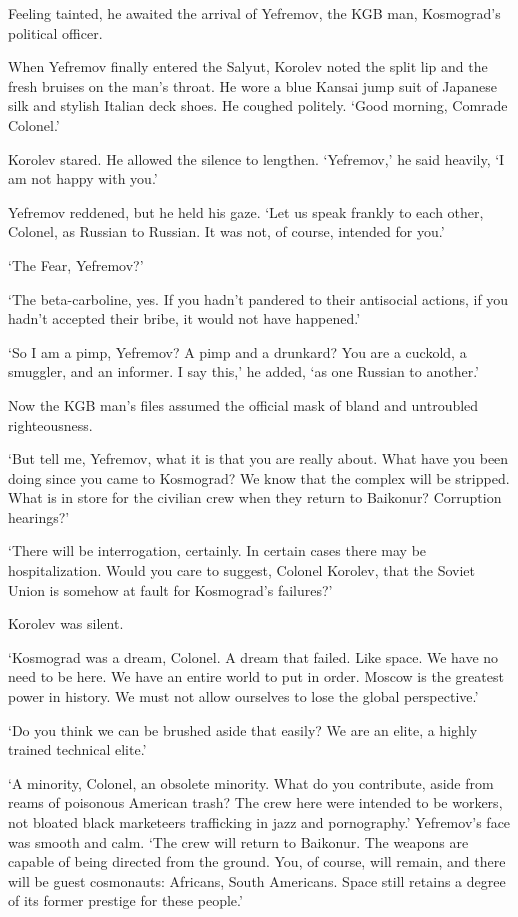 Feeling tainted, he awaited the arrival of Yefremov, the KGB man, Kosmograd’s political officer.

When Yefremov finally entered the Salyut, Korolev noted the split lip and the fresh bruises on the man’s throat. He wore a blue Kansai jump suit of Japanese silk and stylish Italian deck shoes. He coughed politely. ‘Good morning, Comrade Colonel.’

Korolev stared. He allowed the silence to lengthen. ‘Yefremov,’ he said heavily, ‘I am not happy with you.’

Yefremov reddened, but he held his gaze. ‘Let us speak frankly to each other, Colonel, as Russian to Russian. It was not, of course, intended for you.’

‘The Fear, Yefremov?’

‘The beta-carboline, yes. If you hadn’t pandered to their antisocial actions, if you hadn’t accepted their bribe, it would not have happened.’

‘So I am a pimp, Yefremov? A pimp and a drunkard? You are a cuckold, a smuggler, and an informer. I say this,’ he added, ‘as one Russian to another.’

Now the KGB man’s files assumed the official mask of bland and untroubled righteousness.

‘But tell me, Yefremov, what it is that you are really about. What have you been doing since you came to Kosmograd? We know that the complex will be stripped. What is in store for the civilian crew when they return to Baikonur? Corruption hearings?’

‘There will be interrogation, certainly. In certain cases there may be hospitalization. Would you care to suggest, Colonel Korolev, that the Soviet Union is somehow at fault for Kosmograd’s failures?’

Korolev was silent.

‘Kosmograd was a dream, Colonel. A dream that failed. Like space. We have no need to be here. We have an entire world to put in order. Moscow is the greatest power in history. We must not allow ourselves to lose the global perspective.’

‘Do you think we can be brushed aside that easily? We are an elite, a highly trained technical elite.’

‘A minority, Colonel, an obsolete minority. What do you contribute, aside from reams of poisonous American trash? The crew here were intended to be workers, not bloated black marketeers trafficking in jazz and pornography.’ Yefremov’s face was smooth and calm. ‘The crew will return to Baikonur. The weapons are capable of being directed from the ground. You, of course, will remain, and there will be guest cosmonauts: Africans, South Americans. Space still retains a degree of its former prestige for these people.’

